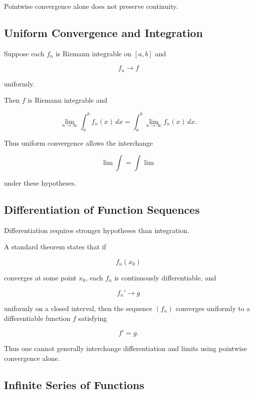 Pointwise convergence alone does not preserve continuity.

\subsection{Uniform Convergence and Integration}
\label{subsec:uniform-convergence-integration}

\begin{theorem}
Suppose each \(f_n\) is Riemann integrable on \([a,b]\) and

\[
f_n\to f
\]

uniformly.

Then \(f\) is Riemann integrable and

\[
\boxed{
\lim_{n\to\infty}
\int_a^b f_n(x)\,dx
=
\int_a^b
\lim_{n\to\infty}f_n(x)\,dx.
}
\]
\end{theorem}

Thus uniform convergence allows the interchange

\[
\boxed{
\lim\int
=
\int\lim
}
\]

under these hypotheses.

\subsection{Differentiation of Function Sequences}
\label{subsec:differentiation-function-sequences}

Differentiation requires stronger hypotheses than integration.

A standard theorem states that if

\[
f_n(x_0)
\]

converges at some point \(x_0\), each \(f_n\) is continuously
differentiable, and

\[
f_n'\to g
\]

uniformly on a closed interval, then the sequence \((f_n)\) converges
uniformly to a differentiable function \(f\) satisfying

\[
\boxed{
f'=g.
}
\]

Thus one cannot generally interchange differentiation and limits using
pointwise convergence alone.

\subsection{Infinite Series of Functions}
\label{subsec:function-series}

